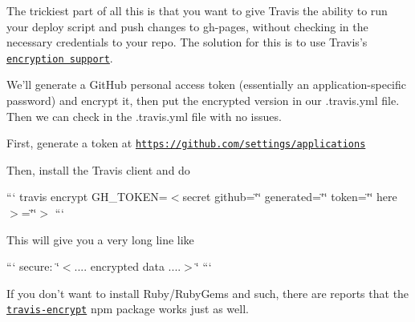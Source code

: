 The trickiest part of all this is that you want to give Travis the ability to run your deploy script and push changes to gh-\/pages, without checking in the necessary credentials to your repo. The solution for this is to use Travis's \href{http://docs.travis-ci.com/user/encryption-keys/}{\tt encryption support}.

We'll generate a Git\-Hub personal access token (essentially an application-\/specific password) and encrypt it, then put the encrypted version in our {\ttfamily .travis.\-yml} file. Then we can check in the {\ttfamily .travis.\-yml} file with no issues.

First, generate a token at \href{https://github.com/settings/applications}{\tt https\-://github.\-com/settings/applications}

Then, install the Travis client and do

``` travis encrypt G\-H\-\_\-\-T\-O\-K\-E\-N=$<$secret github=\char`\"{}\char`\"{} generated=\char`\"{}\char`\"{} token=\char`\"{}\char`\"{} here$>$=\char`\"{}\char`\"{}$>$ ```

This will give you a very long line like

``` secure\-: \char`\"{}$<$.... encrypted data ....$>$\char`\"{} ```

If you don't want to install Ruby/\-Ruby\-Gems and such, there are reports that the \href{http://npmjs.org/travis-encrypt}{\tt travis-\/encrypt} npm package works just as well. 